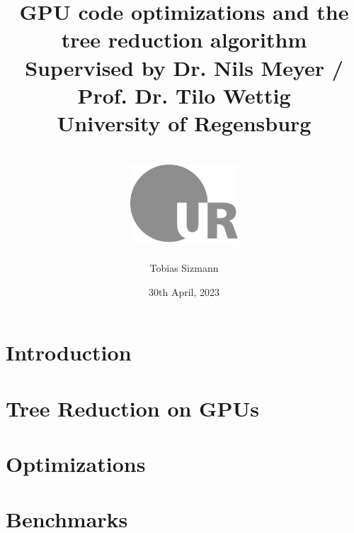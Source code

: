 \documentclass[12pt, twoside]{report}
\title{
    {GPU code optimizations and the tree reduction algorithm} \\
    {\large Supervised by Dr. Nils Meyer / Prof. Dr. Tilo Wettig} \\
    {\large University of Regensburg} \\
    {\ } \\
    {\includegraphics[width = 0.3\textwidth]{ur_logo.jpg}}
}
\author{Tobias Sizmann}
\date{30th April, 2023}
\begin{document}
\maketitle

\tableofcontents

\chapter{Introduction}


\chapter{Tree Reduction on GPUs}


\chapter{Optimizations}


\chapter{Benchmarks}


\printbibliography
\end{document}
